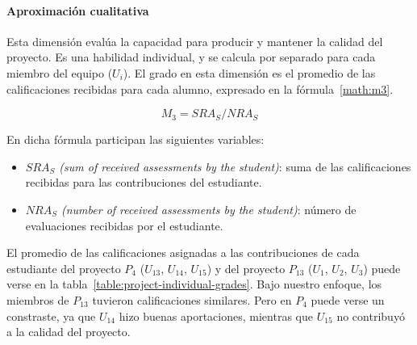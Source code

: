 \paragraph*{Aproximación cualitativa}

Esta dimensión evalúa la capacidad para producir y mantener la calidad del proyecto. Es una habilidad individual, y se calcula por separado para cada miembro del equipo ($U_i$). El grado en esta dimensión es el promedio de las calificaciones recibidas para cada alumno, expresado en la fórmula~\ref{math:m3}.

\begin{equation}
    \textbf{$M_3 = SRA_S/NRA_S$}
    \label{math:m3}
\end{equation}

En dicha fórmula participan las siguientes variables:
\begin{itemize}	
	\item \emph{$SRA_S$ (sum of received assessments by the student)}: suma de las calificaciones recibidas para las contribuciones del estudiante.
	\item \emph{$NRA_S$ (number of received assessments by the student)}: número de evaluaciones recibidas por el estudiante.
\end{itemize} 

El promedio de las calificaciones asignadas a las contribuciones de cada estudiante del proyecto $P_4$ ($U_{13}$, $U_{14}$, $U_{15}$) y del proyecto $P_{13}$ ($U_1$, $U_2$, $U_3$) puede verse en la tabla~\ref{table:project-individual-grades}. Bajo nuestro enfoque, los miembros de $P_{13}$ tuvieron calificaciones similares. Pero en $P_4$ puede verse un constraste, ya que $U_{14}$ hizo buenas aportaciones, mientras que $U_{15}$ no contribuyó a la calidad del proyecto.

